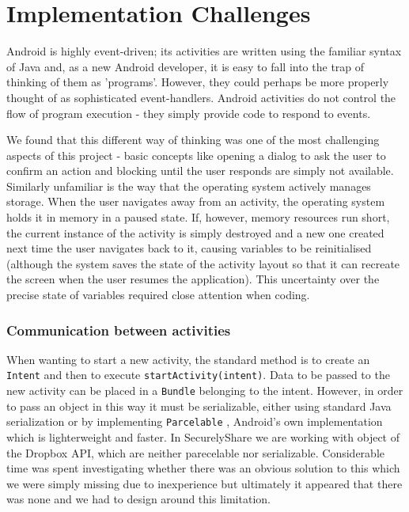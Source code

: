 \section{Implementation Challenges}
Android is highly event-driven; its activities are written using the familiar syntax of Java and, as a new Android developer, it is easy to fall into the trap of thinking of them as 'programs'.  However, they could perhaps be more properly thought of as sophisticated event-handlers.  Android activities do not control the flow of program execution - they simply provide code to respond to events.  

We found that this different way of thinking was one of the most challenging aspects of this project - basic  concepts like opening a dialog to ask the user to confirm an action and blocking until the user responds are simply not available.  Similarly unfamiliar is the way that the operating system actively manages storage.  When the user navigates away from an activity, the operating system holds it in memory in a paused state.  If, however, memory resources run short, the current instance of the activity is simply destroyed and a new one created next time the user navigates back to it, causing variables to be reinitialised (although the system saves the state of the activity layout so that it can recreate the screen when the user resumes the application).  This uncertainty over the precise state of variables required close attention when coding. 

\subsubsection*{Communication between activities}
When wanting to start a new activity, the standard method is to create an \texttt{Intent} and then to execute \texttt{startActivity(intent)}.  Data to be passed to the new activity can be placed in a \texttt{Bundle} belonging to the intent.  However, in order to pass an object in this way it must be serializable, either using standard Java serialization or by implementing \texttt{Parcelable} , Android's own implementation which is lighterweight and faster.  In SecurelyShare we are working with object of the Dropbox API, which are neither parecelable nor serializable.  Considerable time was spent investigating whether there was an obvious solution to this which we were simply missing due to inexperience but ultimately it appeared that there was none and we had to design around this limitation.


